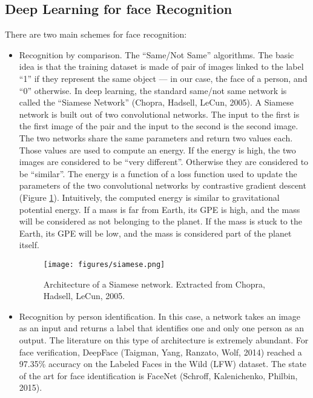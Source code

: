 \subsection{Deep Learning for face Recognition}
There are two main schemes for face recognition:
\begin{itemize}
\item Recognition by comparison. The \enquote{Same/Not Same} algorithms. The basic idea is that the training dataset is made of pair of images linked to the label \enquote{1} if they represent the same object --- in our case, the face of a person, and \enquote{0} otherwise. In deep learning, the standard same/not same network is called the \enquote{Siamese Network} (Chopra, Hadsell, LeCun, 2005). A Siamese network is built out of two convolutional networks. The input to the first is the first image of the pair and the input to the second is the second image. The two networks share the same parameters and return two values each. Those values are used to compute an energy. If the energy is high, the two images are considered to be \enquote{very different}. Otherwise they are considered to be \enquote{similar}. The energy is a function of a loss function used to update the parameters of the two convolutional networks by contrastive gradient descent (Figure \ref{fig:Siamese}). Intuitively, the computed energy is similar to gravitational potential energy. If a mass is far from Earth, its GPE is high, and the mass will be considered as not belonging to the planet. If the mass is stuck to the Earth, its GPE will be low, and the mass is considered part of the planet itself.


\begin{figure}[!ht]
  \centering
  \texttt{[image: figures/siamese.png]}  
  \caption[Architecture of a Siamese network. Extracted from Chopra, Hadsell, LeCun, 2005.]{Architecture of a Siamese network. Extracted from Chopra, Hadsell, LeCun, 2005.}
  \protect\label{fig:Siamese}
\end{figure}

\item Recognition by person identification. In this case, a network takes an image as an input and returns a label that identifies one and only one person as an output. The literature on this type of architecture is extremely abundant. For face verification, DeepFace (Taigman, Yang, Ranzato, Wolf, 2014) reached a 97.35\% accuracy on the Labeled Faces in the Wild (LFW) dataset. The state of the art for face identification is FaceNet (Schroff, Kalenichenko, Philbin, 2015).

\end{itemize}


